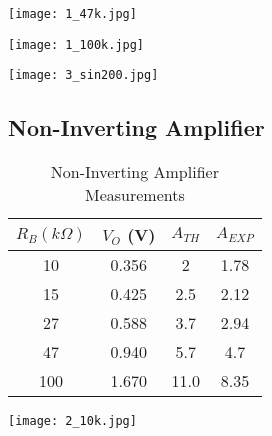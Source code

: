 \documentclass{article}
\begin{document}
\begin{center}
\texttt{[image: 1\_47k.jpg]}
\label{47kinvert}
\end{center}
\vspace{10pt}

\begin{center}
\texttt{[image: 1\_100k.jpg]}
\label{100kinvert}
\end{center}
\vspace{10pt}

\begin{center}
\texttt{[image: 3\_sin200.jpg]}
\label{200invert}
\end{center}
\vspace{10pt}


\subsection{Non-Inverting Amplifier}

\begin{table}[!h]
    \begin{center}
        \begin{tabular}{|c||c|c|c|} \hline
            $R_{B} (k\Omega)$ & $V_{O}$ (V) & $A_{TH}$ & $A_{EXP}$\\ \hline
            10 & 0.356 & 2 & 1.78 \\ \hline
            15 & 0.425 & 2.5 & 2.12\\ \hline
            27 & 0.588 & 3.7 & 2.94\\ \hline
            47 & 0.940 & 5.7 & 4.7\\ \hline
            100 & 1.670 & 11.0 & 8.35\\ \hline
        \end{tabular}
        \caption{Non-Inverting Amplifier Measurements}
        \label{noninvertchart}
    \end{center}
\end{table}
\vspace{10pt}


\begin{center}
\texttt{[image: 2\_10k.jpg]}
\label{10knoninvert}
\end{center}
\vspace{10pt}
\end{document}
